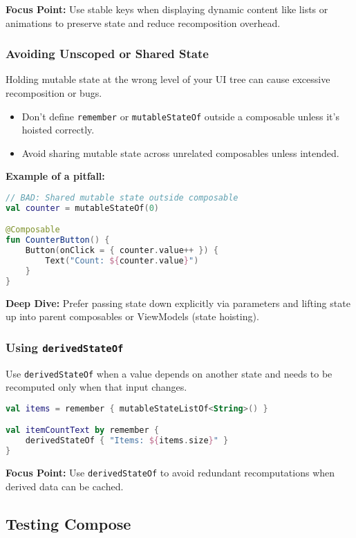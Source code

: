\documentclass[a4paper,12pt]{article}
\begin{document}
\textbf{Focus Point:} Use stable keys when displaying dynamic content like lists or animations to preserve state and reduce recomposition overhead.

\subsubsection{Avoiding Unscoped or Shared State}

Holding mutable state at the wrong level of your UI tree can cause excessive recomposition or bugs.

\begin{itemize}
  \item Don’t define \texttt{remember} or \texttt{mutableStateOf} outside a composable unless it's hoisted correctly.
  \item Avoid sharing mutable state across unrelated composables unless intended.
\end{itemize}

\textbf{Example of a pitfall:}
\begin{lstlisting}[language=Kotlin]
// BAD: Shared mutable state outside composable
val counter = mutableStateOf(0)

@Composable
fun CounterButton() {
    Button(onClick = { counter.value++ }) {
        Text("Count: ${counter.value}")
    }
}
\end{lstlisting}

\textbf{Deep Dive:} Prefer passing state down explicitly via parameters and lifting state up into parent composables or ViewModels (state hoisting).

\subsubsection{Using \texttt{derivedStateOf}}

Use \texttt{derivedStateOf} when a value depends on another state and needs to be recomputed only when that input changes.

\begin{lstlisting}[language=Kotlin]
val items = remember { mutableStateListOf<String>() }

val itemCountText by remember {
    derivedStateOf { "Items: ${items.size}" }
}
\end{lstlisting}

\textbf{Focus Point:} Use \texttt{derivedStateOf} to avoid redundant recomputations when derived data can be cached.

\subsection{Testing Compose}
\end{document}
